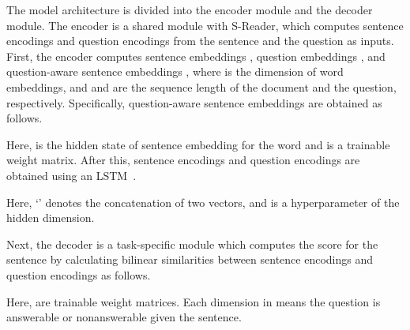 \documentclass[11pt,a4paper]{article}
\begin{document}
The model architecture is divided into the encoder module and the decoder module. The encoder is a shared module with S-Reader, which computes sentence encodings and question encodings from the sentence and the question as inputs.
First, the encoder computes sentence embeddings , question embeddings , and question-aware sentence embeddings , where  is the dimension of word embeddings, and  and  are the sequence length of the document and the question, respectively. Specifically, question-aware sentence embeddings are obtained as follows.

\vspace{-.5cm}


Here,  is the hidden state of sentence embedding for the  word and  is a trainable weight matrix.
After this, sentence encodings and question encodings are obtained using an LSTM~\cite{lstm}.

\vspace{-.5cm}


Here, `' denotes the concatenation of two vectors, and  is a hyperparameter of the hidden dimension.


Next, the decoder is a task-specific module which computes the score for the sentence by calculating bilinear similarities between sentence encodings and question encodings as follows.

\vspace{-.5cm}


\vspace{-2cm}


Here,  are trainable weight matrices. Each dimension in  means the question is answerable or nonanswerable given the sentence.
\end{document}
